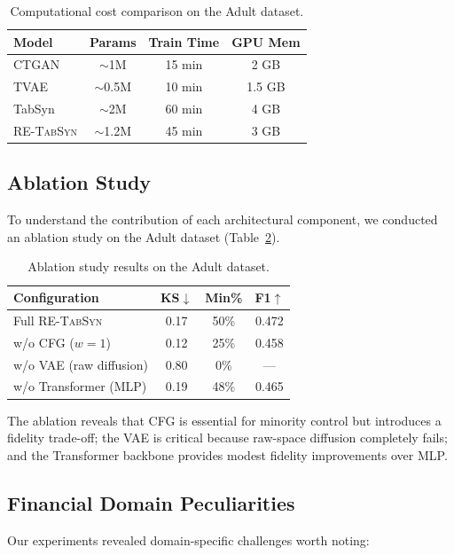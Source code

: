 \documentclass[conference]{IEEEtran}
\newcommand{\retabsyn}{\textsc{RE-TabSyn}}
\begin{document}
\begin{table}[htbp]
\caption{Computational cost comparison on the Adult dataset.}
\label{tab:compute}
\centering
\small
\begin{tabular}{lccc}
\toprule
\textbf{Model} & \textbf{Params} & \textbf{Train Time} & \textbf{GPU Mem} \\
\midrule
CTGAN & $\sim$1M & 15 min & 2 GB \\
TVAE & $\sim$0.5M & 10 min & 1.5 GB \\
TabSyn & $\sim$2M & 60 min & 4 GB \\
\retabsyn{} & $\sim$1.2M & 45 min & 3 GB \\
\bottomrule
\end{tabular}
\end{table}

\subsection{Ablation Study}
To understand the contribution of each architectural component, we conducted an ablation study on the Adult dataset (Table~\ref{tab:ablation}).

\begin{table}[htbp]
\caption{Ablation study results on the Adult dataset.}
\label{tab:ablation}
\centering
\small
\begin{tabular}{lccc}
\toprule
\textbf{Configuration} & \textbf{KS$\downarrow$} & \textbf{Min\%} & \textbf{F1$\uparrow$} \\
\midrule
Full \retabsyn{} & 0.17 & 50\% & 0.472 \\
w/o CFG ($w=1$) & 0.12 & 25\% & 0.458 \\
w/o VAE (raw diffusion) & 0.80 & 0\% & --- \\
w/o Transformer (MLP) & 0.19 & 48\% & 0.465 \\
\bottomrule
\end{tabular}
\end{table}

The ablation reveals that CFG is essential for minority control but introduces a fidelity trade-off; the VAE is critical because raw-space diffusion completely fails; and the Transformer backbone provides modest fidelity improvements over MLP.

\subsection{Financial Domain Peculiarities}
Our experiments revealed domain-specific challenges worth noting:
\end{document}
